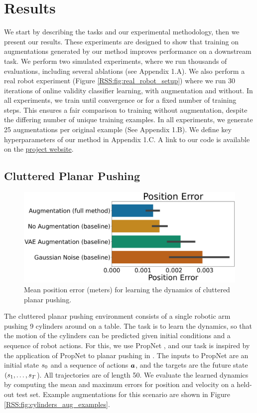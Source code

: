 \section{Results} \label{RSS:sec:results}

We start by describing the tasks and our experimental methodology, then we present our results. These experiments are designed to show that training on augmentations generated by our method improves performance on a downstream task. We perform two simulated experiments, where we run thousands of evaluations, including several ablations (see Appendix 1.A). We also perform a real robot experiment (Figure \ref{RSS:fig:real_robot_setup}) where we run 30 iterations of online validity classifier learning, with augmentation and without. In all experiments, we train until convergence or for a fixed number of training steps. This ensures a fair comparison to training without augmentation, despite the differing number of unique training examples. In all experiments, we generate 25 augmentations per original example (See Appendix 1.B). We define key hyperparameters of our method in Appendix 1.C. A link to our code is available on the \href{https://sites.google.com/view/data-augmentation4manipulation}{project website}.

\subsection{Cluttered Planar Pushing}

\begin{figure}
    \centering
    \includegraphics[width=0.7\linewidth]{Chap3/images/cylinders_results1.png}
    \caption{Mean position error (meters) for learning the dynamics of cluttered planar pushing.}
    \label{RSS:fig:cylinders_results}
\end{figure}

The cluttered planar pushing environment consists of a single robotic arm pushing 9 cylinders around on a table. The task is to learn the dynamics, so that the motion of the cylinders can be predicted given initial conditions and a sequence of robot actions. For this, we use PropNet \cite{Propnet}, and our task is inspired by the application of PropNet to planar pushing in \cite{DBRP2020}. The inputs to PropNet are an initial state $s_0$ and a sequence of actions $\bm{a}$, and the targets are the future state $(s_1,\dots,s_T$). All trajectories are of length 50. We evaluate the learned dynamics by computing the mean and maximum errors for position and velocity on a held-out test set. Example augmentations for this scenario are shown in Figure \ref{RSS:fig:cylinders_aug_examples}. 

